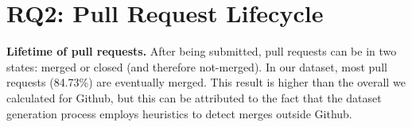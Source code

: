\documentclass{sig-alternate}
\begin{document}
%


%

%

\section{RQ2: Pull Request Lifecycle}
\label{sec:pullreqchar}

\textbf{Lifetime of pull requests.}
After being submitted, pull requests can be in two states: merged or closed
(and therefore not-merged).
In our dataset, most pull requests (84.73\%) are eventually
merged. This result is higher than the overall we calculated for
Github, but this can be attributed to the fact that the dataset generation
process employs heuristics to detect merges outside Github.
\end{document}
